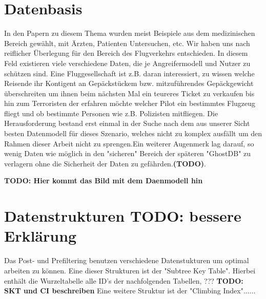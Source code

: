 \chapter{Datenbasis}
In den Papern zu diesem Thema wurden meist Beispiele aus dem medizinischen Bereich gewählt, mit Ärzten, Patienten Untersuchen, etc. Wir haben uns nach reiflicher Überlegung für den Bereich des Flugverkehrs entschieden. In diesem Feld existieren viele verschiedene Daten, die je Angreifermodell und Nutzer zu schützen sind. Eine Fluggesellschaft ist z.B. daran interessiert, zu wissen welche Reisende
ihr Kontigent an Gepäckstückem bzw. mitzuführendes Gepäckgewicht überschreiten um ihnen beim nächsten Mal ein teureres Ticket zu verkaufen bis hin zum Terroristen der erfahren möchte welcher Pilot ein bestimmtes Flugzeug fliegt und ob bestimmte Personen wie z.B. Polizisten mitfliegen.
Die Herausforderung bestand erst einmal in der Suche nach dem aus unserer Sicht besten Datenmodell für dieses Szenario, welches nicht zu komplex ausfällt um den Rahmen dieser Arbeit nicht zu sprengen.Ein weiterer Augenmerk lag darauf, so wenig Daten wie möglich in den "sicheren" Bereich der späteren "GhostDB" zu verlagern ohne die Sicherheit der Daten zu gefährden.\textbf{(TODO)}. 


\textbf{TODO: Hier kommt das Bild mit dem Daenmodell hin}

\chapter{Datenstrukturen TODO: bessere Erklärung}

Das Post- und Prefiltering benutzen verschiedene Datenstukturen um optimal arbeiten zu können.
Eine dieser Strukturen ist der "Subtree Key Table". Hierbei enthält die Wurzeltabelle  alle ID's der nachfolgenden Tabellen, ???
\textbf{TODO: SKT und CI beschreiben}
Eine weitere Struktur ist der "Climbing Index"......

